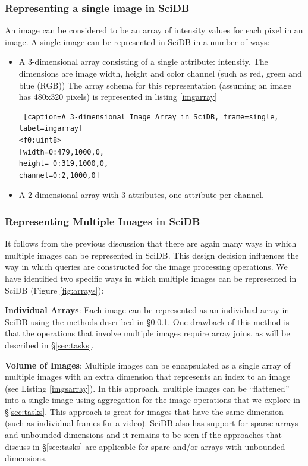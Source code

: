 \documentclass[letterpaper,twocolumn,10pt]{article}
\begin{document}
\subsubsection{Representing a single image in SciDB}\label{sec:singleimage}
An image can be considered to be an array of intensity values for each pixel in an image. A single image can be represented in SciDB in a number of ways:

\begin{itemize}
\item A 3-dimensional array consisting of a single attribute: intensity. The dimensions are image width, height and color channel (such as red, green and blue (RGB)) The array schema for this representation (assuming an image has 480x320 pixels) is represented in listing \ref{imgarray} 

\begin{lstlisting} [caption=A 3-dimensional Image Array in SciDB, frame=single, label=imgarray]
<f0:uint8> 
[width=0:479,1000,0, 
height= 0:319,1000,0, 
channel=0:2,1000,0]
\end{lstlisting}

\item A 2-dimensional array with 3 attributes, one attribute per channel.
\end{itemize}

\subsubsection{Representing Multiple Images in SciDB}
It follows from the previous discussion that there are again many ways in which multiple images can be represented in SciDB. This design decision influences the way in which queries are constructed for the image processing operations. We have identified two specific ways in which multiple images can be represented in SciDB (Figure \ref{fig:arrays}):

\textbf{Individual Arrays}: Each image can be represented as an individual array in SciDB using the methods described in \S\ref{sec:singleimage}. One drawback of this method is that the operations that involve multiple images require array joins, as will be described in \S\ref{sec:tasks}.

\textbf{Volume of Images}: Multiple images can be encapsulated as a single array of multiple images with an extra dimension that represents an index to an image (see Listing \ref{imgsarray}). In this approach, multiple images can be ``flattened'' into a single image using aggregation for the image operations that we explore in \S\ref{sec:tasks}. This approach is great for images that have the same dimension (such as individual frames for a video). SciDB also has support for sparse arrays and unbounded dimensions and it remains to be seen if the approaches that discuss in \S\ref{sec:tasks} are applicable for spare and/or arrays with unbounded dimensions.
\end{document}
